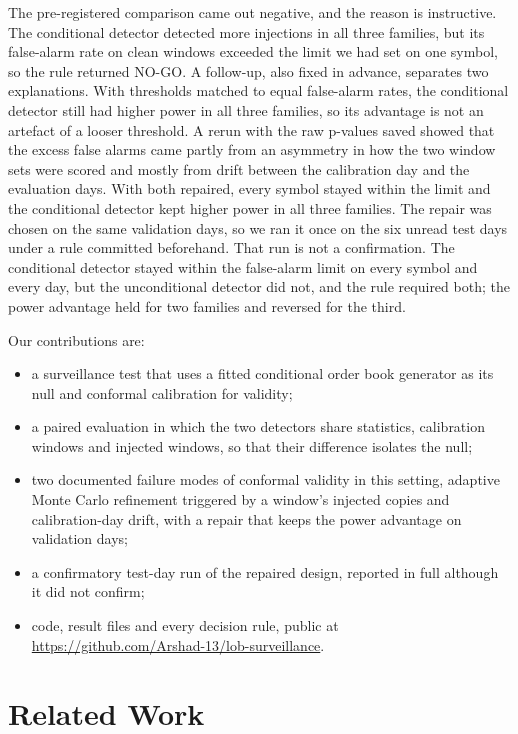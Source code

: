 \documentclass[journal]{IEEEtran}
\begin{document}
The pre-registered comparison came out negative, and the reason is instructive. The conditional detector
detected more injections in all three families, but its false-alarm rate on clean windows exceeded the limit
we had set on one symbol, so the rule returned NO-GO. A follow-up, also fixed in advance, separates two
explanations. With thresholds matched to equal false-alarm rates, the conditional detector still had higher
power in all three families, so its advantage is not an artefact of a looser threshold. A rerun with the raw
p-values saved showed that the excess false alarms came partly from an asymmetry in how the two window sets were
scored and mostly from drift between the calibration day and the evaluation days. With both repaired, every
symbol stayed within the limit and the conditional detector kept higher power in all three families. The repair
was chosen on the same validation days, so we ran it once on the six unread test days under a rule committed
beforehand. That run is not a confirmation. The conditional detector stayed within the false-alarm limit on every symbol and
every day, but the unconditional detector did not, and the rule required both; the power advantage held for two
families and reversed for the third.

Our contributions are:
\begin{itemize}
\item a surveillance test that uses a fitted conditional order book generator as its null and conformal
calibration for validity;
\item a paired evaluation in which the two detectors share statistics, calibration windows and injected windows,
so that their difference isolates the null;
\item two documented failure modes of conformal validity in this setting, adaptive Monte Carlo refinement
triggered by a window's injected copies and calibration-day drift, with a repair that keeps the power
advantage on validation days;
\item a confirmatory test-day run of the repaired design, reported in full although it did not confirm;
\item code, result files and every decision rule, public at
\url{https://github.com/Arshad-13/lob-surveillance}.
\end{itemize}

\section{Related Work}
\end{document}
